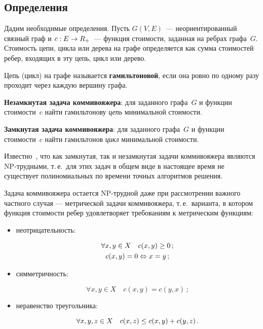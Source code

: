 \begin{multicols}{2}
\section{Определения}

Дадим необходимые определения.
Пусть $G(V,E)$~--- неориентированный связный граф и $c: E\hm\rightarrow R_{+}$~---
функция стоимости, заданная на ребрах графа~$G$. Стоимость цепи, цикла или дерева на графе
определяется как сумма стоимостей ребер, входящих в эту цепь, цикл или дерево.

Цепь (цикл) на графе называется \textbf{га\-миль\-то\-но\-вой}, если она ровно по одному разу
проходит через каждую вершину графа.

\textbf{Незамкнутая задача коммивояжера}: для заданного графа~$G$ и
функции стоимости~$c$
найти гамильтонову {\it цепь} минимальной стоимости.

\textbf{Замкнутая задача коммивояжера}: для заданного графа~$G$ и функции стоимости~$c$
найти гамильтонов {\it цикл} минимальной стоимости.

Известно~\cite{Gary_Johnson, Christofides}, что как замкнутая, так и незамкнутая
задачи коммивояжера являются NP-труд\-ны\-ми, т.\,е.\ для этих задач в общем виде в
настоящее время не существует полиномиальных по времени точных алгоритмов решения.

Задача коммивояжера остается NP-трудной даже при рассмотрении важного частного случая ---
метрической задачи коммивояжера, т.\,е.\ варианта, в котором функция стоимости
ребер удовлетворяет требованиям к метрическим функциям:
\begin{itemize}
\item
неотрицательность:

\noindent
\begin{gather*}
\forall x,y \in X \quad c(x,y)\geq 0\,;
\\
c(x,y)\hm=0 \Leftrightarrow  x=y\,;
\end{gather*}
\item
симметричность:

\vspace*{2pt}

\noindent
$$
\forall x,y \in X \quad c(x,y)= c(y,x)\,;
$$
\item
неравенство треугольника:

\vspace*{2pt}

\noindent
$$
\forall x,y,z \in X \quad c(x,z) \leq c(x,y)\hm + c(y,z)\,.
$$
\end{itemize}


\end{multicols}
